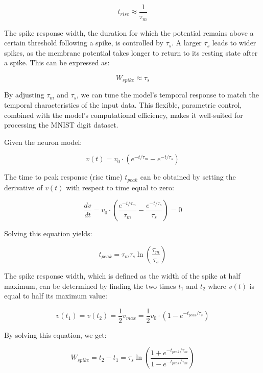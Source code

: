\begin{equation}
    t_{rise} \approx \frac{1}{\tau_m}
\end{equation}

The spike response width, the duration for which the potential remains above a certain threshold following a spike, is controlled by $\tau_s$. A larger $\tau_s$ leads to wider spikes, as the membrane potential takes longer to return to its resting state after a spike. This can be expressed as:

\begin{equation}
    W_{spike} \approx \tau_s
\end{equation}

By adjusting $\tau_m$ and $\tau_s$, we can tune the model's temporal response to match the temporal characteristics of the input data. This flexible, parametric control, combined with the model's computational efficiency, makes it well-suited for processing the MNIST digit dataset.


Given the neuron model:

\begin{equation}
v(t) = v_0 \cdot (e^{-t/\tau_m} - e^{-t/\tau_s})
\end{equation}

The time to peak response (rise time) $t_{peak}$ can be obtained by setting the derivative of $v(t)$ with respect to time equal to zero:

\begin{equation}
\frac{dv}{dt} = v_0 \cdot \left( \frac{e^{-t/\tau_m}}{\tau_m} - \frac{e^{-t/\tau_s}}{\tau_s} \right) = 0
\end{equation}

Solving this equation yields:

\begin{equation}
t_{peak} = \tau_m \tau_s \ln\left(\frac{\tau_m}{\tau_s}\right)
\end{equation}

The spike response width, which is defined as the width of the spike at half maximum, can be determined by finding the two times $t_1$ and $t_2$ where $v(t)$ is equal to half its maximum value:

\begin{equation}
v(t_1) = v(t_2) = \frac{1}{2} v_{max} = \frac{1}{2} v_0 \cdot (1 - e^{-t_{peak}/\tau_s})
\end{equation}

By solving this equation, we get:

\begin{equation}
W_{spike} = t_2 - t_1 = \tau_s \ln\left(\frac{1 + e^{-t_{peak}/\tau_m}}{1 - e^{-t_{peak}/\tau_m}}\right)
\end{equation}

